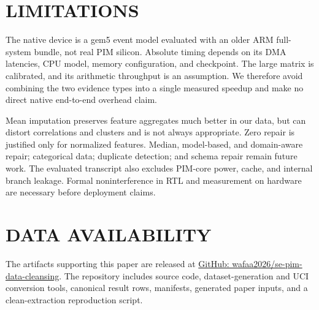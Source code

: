 \documentclass[conference]{IEEEtran}
\begin{document}
\section{LIMITATIONS}
The native device is a gem5 event model evaluated with an older ARM
full-system bundle, not real PIM silicon. Absolute timing depends on its DMA
latencies, CPU model, memory configuration, and checkpoint. The large matrix is
calibrated, and its arithmetic throughput is an assumption. We therefore avoid
combining the two evidence types into a single measured speedup and make no
direct native end-to-end overhead claim.

Mean imputation preserves feature aggregates much better in our data, but can
distort correlations and clusters and is not always appropriate. Zero repair
is justified only for normalized features. Median, model-based, and
domain-aware repair; categorical data; duplicate detection; and schema repair
remain future work. The evaluated transcript also excludes PIM-core power,
cache, and internal branch leakage. Formal noninterference in RTL and
measurement on hardware are necessary before deployment claims.

\section*{DATA AVAILABILITY}
The artifacts supporting this paper are released at
\href{https://github.com/wafaa2026/se-pim-data-cleansing}{GitHub:
wafaa2026/se-pim-data-cleansing}. The repository includes source code,
dataset-generation and UCI conversion tools, canonical result rows, manifests,
generated paper inputs, and a clean-extraction reproduction script.
\end{document}
